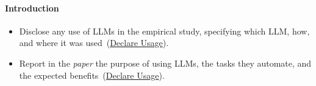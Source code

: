 \documentclass[smallextended]{svjour3}
\newcommand{\must}{\textbf{must}\xspace}
\newcommand{\should}{\textbf{should}\xspace}
\newcommand{\paper}{\emph{paper}\xspace}
\newcommand{\paper}{\emph{paper}\xspace}
\newcommand{\iconM}{\usebox{\iconMbox}\xspace}
\newcommand{\iconS}{\usebox{\iconSbox}\xspace}
\newcommand{\iconM}{●\xspace}
\newcommand{\iconS}{○\xspace}
\newcommand{\refdeclareusage}{\hyperref[sec:declare-llm-usage-and-role]{Declare Usage}}
\newcommand{\refdeclareusage}{\href{/guidelines/declare-usage/}{Declare Usage}}
\begin{document}
\begin{appendices}
\paragraph{\textbf{Introduction}}
\begin{itemize}[label={},leftmargin=*]
    \item \iconM Disclose any use of LLMs in the empirical study, specifying which LLM, how, and where it was used~(\refdeclareusage).
    \item \iconS Report in the \paper the purpose of using LLMs, the tasks they automate, and the expected benefits~(\refdeclareusage).
\end{itemize}


\end{appendices}
\end{document}
